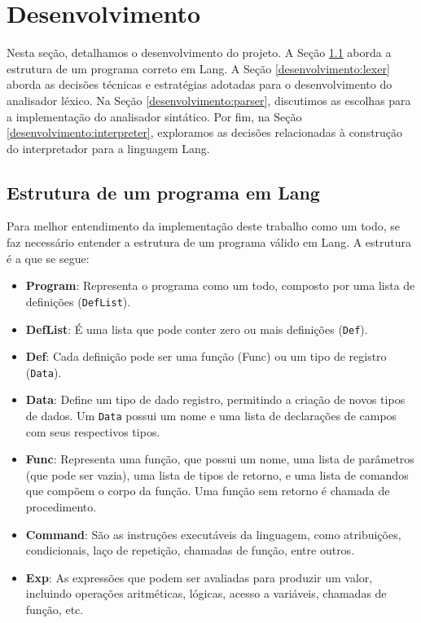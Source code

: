 \documentclass{article}
\begin{document}
\section{Desenvolvimento}
Nesta seção, detalhamos o desenvolvimento do projeto. A Seção \ref{desenvolvimento:estrutura-lang} aborda a estrutura de um programa correto em Lang. A Seção \ref{desenvolvimento:lexer} aborda as decisões técnicas e estratégias adotadas para o desenvolvimento do analisador léxico. Na Seção \ref{desenvolvimento:parser}, discutimos as escolhas para a implementação do analisador sintático. Por fim, na Seção \ref{desenvolvimento:interpreter}, exploramos as decisões relacionadas à construção do interpretador para a linguagem Lang.

\subsection{Estrutura de um programa em Lang}\label{desenvolvimento:estrutura-lang}

Para melhor entendimento da implementação deste trabalho como um todo, se faz necessário entender a estrutura de um programa válido em Lang. A estrutura é a que se segue:

\begin{itemize}
    \item \textbf{Program}: Representa o programa como um todo, composto por uma lista de definições (\texttt{DefList}).
    \item \textbf{DefList}: É uma lista que pode conter zero ou mais definições (\texttt{Def}).
    \item \textbf{Def}: Cada definição pode ser uma função (Func) ou um tipo de registro (\texttt{Data}).
    \item \textbf{Data}: Define um tipo de dado registro, permitindo a criação de novos tipos de dados. Um \texttt{Data} possui um nome e uma lista de declarações de campos com seus respectivos tipos.
    \item \textbf{Func}: Representa uma função, que possui um nome, uma lista de parâmetros (que pode ser vazia), uma lista de tipos de retorno, e uma lista de comandos que compõem o corpo da função. Uma função sem retorno é chamada de procedimento.
    \item \textbf{Command}: São as instruções executáveis da linguagem, como atribuições, condicionais, laço de repetição, chamadas de função, entre outros.
    \item \textbf{Exp}: As expressões que podem ser avaliadas para produzir um valor, incluindo operações aritméticas, lógicas, acesso a variáveis, chamadas de função, etc.
\end{itemize}
\end{document}
